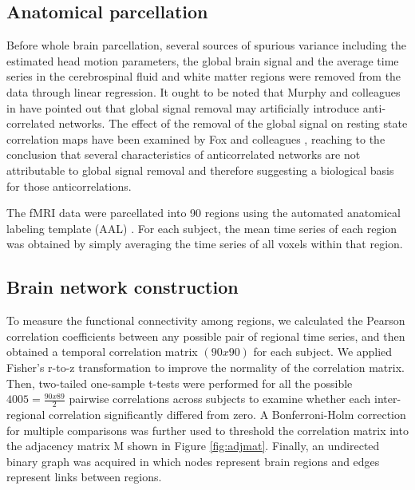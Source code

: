 \documentclass[12pt,a4paper]{article}
\begin{document}
\subsection{Anatomical parcellation} 
Before whole brain parcellation, several sources of spurious variance including
the estimated head motion parameters, the global brain signal and the average
time series in the cerebrospinal fluid and white matter regions were removed
from the data through linear regression. It ought to be noted that Murphy and colleagues in \citep{murphy_impact_2009}  
have pointed out that global signal removal may artificially introduce anti-correlated networks. 
The effect of the removal of the global signal on resting state correlation maps have been examined by Fox and colleagues \citep{fox_global_2009}, reaching to the conclusion that several characteristics of anticorrelated networks are not attributable to global signal removal and therefore suggesting a biological basis for those anticorrelations. 

The fMRI data were parcellated into 90 regions using the automated anatomical labeling template (AAL) \citep{tzourio-mazoyer_automated_2002}. For each subject, the mean time series of each region was obtained by simply
averaging the time series of all voxels within that region.

\subsection{Brain network construction} 
To measure the functional connectivity among regions, we calculated the Pearson
correlation coefficients between any possible pair of regional time series, and
then obtained a temporal correlation matrix $(90x90)$ for each subject. We
applied Fisher's r-to-z transformation to improve the normality of the
correlation matrix. Then, two-tailed one-sample t-tests were performed for all
the possible $4005=\frac{90x89}{2}$ pairwise correlations across subjects
to examine whether each inter-regional correlation significantly differed from
zero. 
A Bonferroni-Holm correction for multiple comparisons was
further used to threshold the correlation matrix into the adjacency matrix M shown in Figure \ref{fig:adjmat}. Finally, an undirected binary graph was acquired in which nodes represent brain regions and edges represent links between regions.
\end{document}
